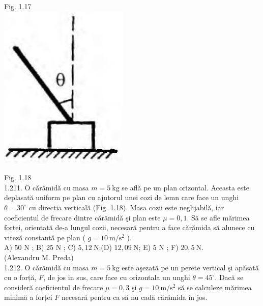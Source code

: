 \documentclass[10pt]{article}
\begin{document}
Fig. 1.17\\
\includegraphics[max width=\textwidth, center]{2025_07_01_5b3ff9fa0d508c8e9f17g-048(1)}

Fig. 1.18\\
1.211. O cărămidă cu masa $m=5 \mathrm{~kg}$ se află pe un plan orizontal. Aceasta este deplasată uniform pe plan cu ajutorul unei cozi de lemn care face un unghi $\theta=30^{\circ}$ cu directia verticală (Fig. 1.18). Masa cozii este neglijabilă, iar coeficientul de frecare dintre cărămidă şi plan este $\mu=0,1$. Să se afle mărimea fortei, orientată de-a lungul cozii, necesară pentru a face cărămida să alunece cu viteză constantă pe plan ( $g=10 \mathrm{~m} / \mathrm{s}^{2}$ ).\\
A) 50 N ; B) 25 N ; C) $5,12 \mathrm{~N}$;(D) $12,09 \mathrm{~N}$; E) 5 N ; F) $20,5 \mathrm{~N}$.\\
(Alexandru M. Preda)\\
1.212. O cărămidă cu masa $m=5 \mathrm{~kg}$ este aşezată pe un perete vertical şi apăsată cu o forță, $F$, de jos in sus, care face cu orizontala un unghi $\theta=45^{\circ}$. Dacă se consideră coeficientul de frecare $\mu=0,3$ şi $g=10 \mathrm{~m} / \mathrm{s}^{2}$ să se calculeze mărimea minimă a forței $F$ necesară pentru ca să nu cadă cărămida în jos.
\end{document}
